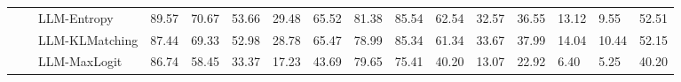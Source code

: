 \begin{table}[ht!]
\begin{tabularx}{\textwidth}{@{}l l l |l *{11}{Y}|Y@{}}
 &  & LLM-Entropy & 89.57 & 70.67 & 53.66 & 29.48 & 65.52 & 81.38 & 85.54 & 62.54 & 32.57 & 36.55 & 13.12 & 9.55 & 52.51 \\
 &  & LLM-KLMatching & 87.44 & 69.33 & 52.98 & 28.78 & 65.47 & 78.99 & 85.34 & 61.34 & 33.67 & 37.99 & 14.04 & 10.44 & 52.15 \\
 &  & LLM-MaxLogit & 86.74 & 58.45 & 33.37 & 17.23 & 43.69 & 79.65 & 75.41 & 40.20 & 13.07 & 22.92 & 6.40 & 5.25 & 40.20 \\
\bottomrule
\end{tabularx}
\label{table::openset_LCR0.1}
\end{table}